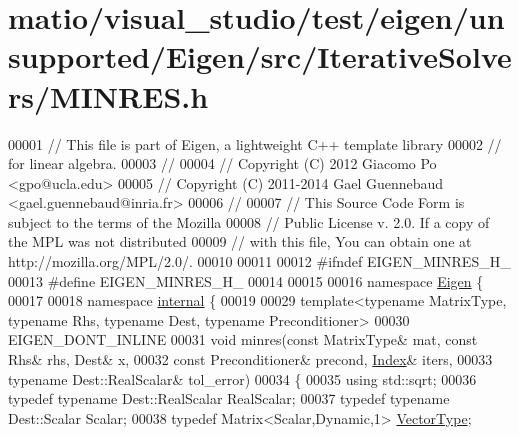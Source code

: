 \hypertarget{matio_2visual__studio_2test_2eigen_2unsupported_2_eigen_2src_2_iterative_solvers_2_m_i_n_r_e_s_8h_source}{}\section{matio/visual\+\_\+studio/test/eigen/unsupported/\+Eigen/src/\+Iterative\+Solvers/\+M\+I\+N\+R\+ES.h}
\label{matio_2visual__studio_2test_2eigen_2unsupported_2_eigen_2src_2_iterative_solvers_2_m_i_n_r_e_s_8h_source}

\begin{DoxyCode}
00001 \textcolor{comment}{// This file is part of Eigen, a lightweight C++ template library}
00002 \textcolor{comment}{// for linear algebra.}
00003 \textcolor{comment}{//}
00004 \textcolor{comment}{// Copyright (C) 2012 Giacomo Po <gpo@ucla.edu>}
00005 \textcolor{comment}{// Copyright (C) 2011-2014 Gael Guennebaud <gael.guennebaud@inria.fr>}
00006 \textcolor{comment}{//}
00007 \textcolor{comment}{// This Source Code Form is subject to the terms of the Mozilla}
00008 \textcolor{comment}{// Public License v. 2.0. If a copy of the MPL was not distributed}
00009 \textcolor{comment}{// with this file, You can obtain one at http://mozilla.org/MPL/2.0/.}
00010 
00011 
00012 \textcolor{preprocessor}{#ifndef EIGEN\_MINRES\_H\_}
00013 \textcolor{preprocessor}{#define EIGEN\_MINRES\_H\_}
00014 
00015 
00016 \textcolor{keyword}{namespace }\hyperlink{namespace_eigen}{Eigen} \{
00017     
00018     \textcolor{keyword}{namespace }\hyperlink{namespaceinternal}{internal} \{
00019         
00029         \textcolor{keyword}{template}<\textcolor{keyword}{typename} MatrixType, \textcolor{keyword}{typename} Rhs, \textcolor{keyword}{typename} Dest, \textcolor{keyword}{typename} Preconditioner>
00030         EIGEN\_DONT\_INLINE
00031         \textcolor{keywordtype}{void} minres(\textcolor{keyword}{const} MatrixType& mat, \textcolor{keyword}{const} Rhs& rhs, Dest& x,
00032                     \textcolor{keyword}{const} Preconditioner& precond, \hyperlink{namespace_eigen_a62e77e0933482dafde8fe197d9a2cfde}{Index}& iters,
00033                     \textcolor{keyword}{typename} Dest::RealScalar& tol\_error)
00034         \{
00035             \textcolor{keyword}{using} std::sqrt;
00036             \textcolor{keyword}{typedef} \textcolor{keyword}{typename} Dest::RealScalar RealScalar;
00037             \textcolor{keyword}{typedef} \textcolor{keyword}{typename} Dest::Scalar Scalar;
00038             \textcolor{keyword}{typedef} Matrix<Scalar,Dynamic,1> \hyperlink{struct_vector_type}{VectorType};

\end{DoxyCode}
